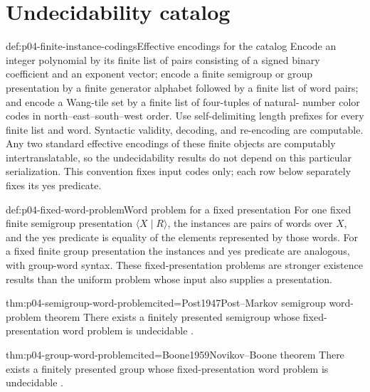 \section{Undecidability catalog}
\label{sec:p04-undecidability-catalog}

\begin{hbconvention}{def:p04-finite-instance-codings}{Effective encodings for the catalog}
Encode an integer polynomial by its finite list of pairs consisting of a signed
binary coefficient and an exponent vector; encode a finite semigroup or group
presentation by a finite generator alphabet followed by a finite list of word
pairs; and encode a Wang-tile set by a finite list of four-tuples of natural-
number color codes in north--east--south--west order.  Use self-delimiting
length prefixes for every finite list and word.  Syntactic validity, decoding,
and re-encoding are computable.  Any two standard effective encodings of these
finite objects are computably intertranslatable, so the undecidability results
do not depend on this particular serialization.  This convention fixes input
codes only; each row below separately fixes its yes predicate.
\end{hbconvention}

\begin{hbdefinition}{def:p04-fixed-word-problem}{Word problem for a fixed presentation}
For one fixed finite semigroup presentation \(\langle X\mid R\rangle\), the
instances are pairs of words over \(X\), and the yes predicate is equality of
the elements represented by those words.  For a fixed finite group
presentation the instances and yes predicate are analogous, with group-word
syntax.  These fixed-presentation problems are stronger existence results
than the uniform problem whose input also supplies a presentation.
\end{hbdefinition}

\begin{hbtheorem}{thm:p04-semigroup-word-problem}{cited=Post1947}{Post--Markov semigroup word-problem theorem}
There exists a finitely presented semigroup whose fixed-presentation word
problem is undecidable \cite{Post1947,Markov1947}.
\end{hbtheorem}

\begin{hbtheorem}{thm:p04-group-word-problem}{cited=Boone1959}{Novikov--Boone theorem}
There exists a finitely presented group whose fixed-presentation word problem
is undecidable \cite{Novikov1955,Boone1958,Boone1959}.
\end{hbtheorem}

